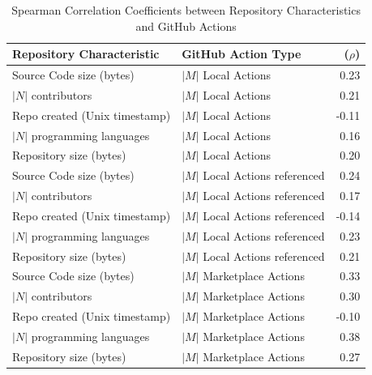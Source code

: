 \documentclass[conference]{IEEEtran}
\begin{document}
      \begin{table}[h]
          \centering
          \caption{Spearman Correlation Coefficients between Repository Characteristics and GitHub Actions}
          \label{tab:correlation_results}
          \hspace{1cm}
          \begin{tabular}{|l|l|r|}
              \hline
              \textbf{Repository Characteristic} & \textbf{GitHub Action Type} & \textbf{(\(\rho\))} \\
              \hline
              Source Code size (bytes) & $|M|$ Local Actions & 0.23 \\
              \hline
              $|N|$ contributors &  $|M|$ Local Actions & 0.21 \\
              \hline
              Repo created (Unix timestamp) &  $|M|$ Local Actions & -0.11 \\
              \hline
              $|N|$ programming languages & $|M|$ Local Actions & 0.16 \\
              \hline
              Repository size (bytes) & $|M|$ Local Actions & 0.20 \\
              \hline
              Source Code size (bytes) & $|M|$ Local Actions referenced & 0.24 \\
              \hline
              $|N|$ contributors  & $|M|$ Local Actions referenced & 0.17 \\
              \hline
              Repo created (Unix timestamp) & $|M|$ Local Actions referenced & -0.14 \\
              \hline
              $|N|$ programming languages & $|M|$ Local Actions referenced & 0.23 \\
              \hline
              Repository size (bytes) & $|M|$ Local Actions referenced & 0.21 \\
              \hline
              Source Code size (bytes) & $|M|$ Marketplace Actions & 0.33 \\
              \hline
              $|N|$ contributors & $|M|$ Marketplace Actions & 0.30 \\
              \hline
              Repo created (Unix timestamp) & $|M|$ Marketplace Actions & -0.10 \\
              \hline
              $|N|$ programming languages & $|M|$ Marketplace Actions & 0.38 \\
              \hline
              Repository size (bytes) & $|M|$ Marketplace Actions & 0.27 \\

\end{tabular}
\end{table}
\end{document}
